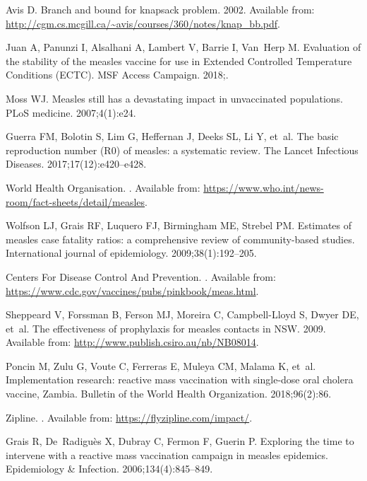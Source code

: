 \documentclass[10pt,letterpaper]{article}
\begin{document}
\begin{thebibliography}{10}
Avis D.
\newblock Branch and bound for knapsack problem. 2002. Available from:
  \url{http://cgm.cs.mcgill.ca/~avis/courses/360/notes/knap_bb.pdf}.

Juan A, Panunzi I, Alsalhani A, Lambert V, Barrie I, Van~Herp M.
\newblock Evaluation of the stability of the measles vaccine for use in
  \uppercase{E}xtended \uppercase{C}ontrolled \uppercase{T}emperature
  \uppercase{C}onditions (\uppercase{ECTC}).
\newblock MSF Access Campaign. 2018;.

Moss WJ.
\newblock Measles still has a devastating impact in unvaccinated populations.
\newblock PLoS medicine. 2007;4(1):e24.

Guerra FM, Bolotin S, Lim G, Heffernan J, Deeks SL, Li Y, et~al.
\newblock The basic reproduction number (R0) of measles: a systematic review.
\newblock The Lancet Infectious Diseases. 2017;17(12):e420--e428.

{World \uppercase{H}ealth \uppercase{O}rganisation}.
.
\newblock Available from:
  \url{https://www.who.int/news-room/fact-sheets/detail/measles}.

Wolfson LJ, Grais RF, Luquero FJ, Birmingham ME, Strebel PM.
\newblock Estimates of measles case fatality ratios: a comprehensive review of
  community-based studies.
\newblock International journal of epidemiology. 2009;38(1):192--205.

{Centers For Disease Control And Prevention}.
.
\newblock Available from:
  \url{https://www.cdc.gov/vaccines/pubs/pinkbook/meas.html}.

Sheppeard V, Forssman B, Ferson MJ, Moreira C, Campbell-Lloyd S, Dwyer DE,
  et~al.
\newblock The effectiveness of prophylaxis for measles contacts in
  \uppercase{NSW}. 2009. Available from:
  \url{http://www.publish.csiro.au/nb/NB08014}.

Poncin M, Zulu G, Voute C, Ferreras E, Muleya CM, Malama K, et~al.
\newblock Implementation research: reactive mass vaccination with single-dose
  oral cholera vaccine, \uppercase{Z}ambia.
\newblock Bulletin of the World Health Organization. 2018;96(2):86.

Zipline.
.
\newblock Available from: \url{https://flyzipline.com/impact/}.

Grais R, De~Radigu{\`e}s X, Dubray C, Fermon F, Guerin P.
\newblock Exploring the time to intervene with a reactive mass vaccination
  campaign in measles epidemics.
\newblock Epidemiology \& Infection. 2006;134(4):845--849.


\end{thebibliography}
\end{document}
